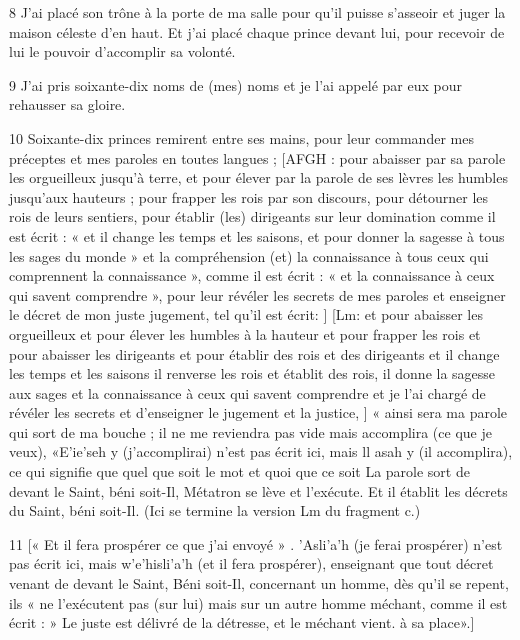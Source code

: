 \par 8 J'ai placé son trône à la porte de ma salle pour qu'il puisse s'asseoir et juger la maison céleste d'en haut. Et j'ai placé chaque prince devant lui, pour recevoir de lui le pouvoir d'accomplir sa volonté.

\par 9 J'ai pris soixante-dix noms de (mes) noms et je l'ai appelé par eux pour rehausser sa gloire.

\par 10 Soixante-dix princes remirent entre ses mains, pour leur commander mes préceptes et mes paroles en toutes langues ; [AFGH : pour abaisser par sa parole les orgueilleux jusqu'à terre, et pour élever par la parole de ses lèvres les humbles jusqu'aux hauteurs ; pour frapper les rois par son discours, pour détourner les rois de leurs sentiers, pour établir (les) dirigeants sur leur domination comme il est écrit : « et il change les temps et les saisons, et pour donner la sagesse à tous les sages du monde » et la compréhension (et) la connaissance à tous ceux qui comprennent la connaissance », comme il est écrit : « et la connaissance à ceux qui savent comprendre », pour leur révéler les secrets de mes paroles et enseigner le décret de mon juste jugement, tel qu'il est écrit: ] [Lm: et pour abaisser les orgueilleux et pour élever les humbles à la hauteur et pour frapper les rois et pour abaisser les dirigeants et pour établir des rois et des dirigeants et il change les temps et les saisons il renverse les rois et établit des rois, il donne la sagesse aux sages et la connaissance à ceux qui savent comprendre et je l'ai chargé de révéler les secrets et d'enseigner le jugement et la justice, ] « ainsi sera ma parole qui sort de ma bouche ; il ne me reviendra pas vide mais accomplira (ce que je veux), «E'ie'seh y (j'accomplirai) n'est pas écrit ici, mais ll asah y (il accomplira), ce qui signifie que quel que soit le mot et quoi que ce soit La parole sort de devant le Saint, béni soit-Il, Métatron se lève et l'exécute. Et il établit les décrets du Saint, béni soit-Il. (Ici se termine la version Lm du fragment c.)

\par 11 [« Et il fera prospérer ce que j'ai envoyé » . 'Asli'a'h (je ferai prospérer) n'est pas écrit ici, mais w'e'hisli'a'h (et il fera prospérer), enseignant que tout décret venant de devant le Saint, Béni soit-Il, concernant un homme, dès qu'il se repent, ils « ne l'exécutent pas (sur lui) mais sur un autre homme méchant, comme il est écrit : » Le juste est délivré de la détresse, et le méchant vient. à sa place».]


